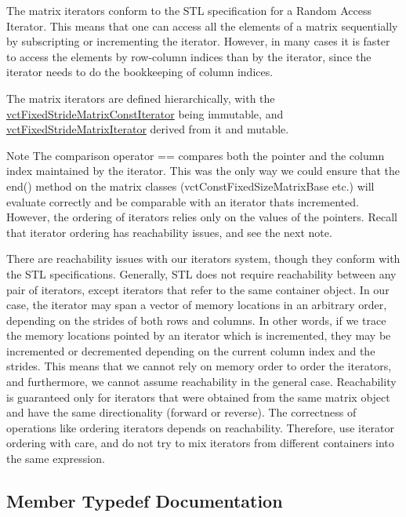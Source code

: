 The matrix iterators conform to the S\+T\+L specification for a Random Access Iterator. This means that one can access all the elements of a matrix sequentially by subscripting or incrementing the iterator. However, in many cases it is faster to access the elements by row-\/column indices than by the iterator, since the iterator needs to do the bookkeeping of column indices.

The matrix iterators are defined hierarchically, with the \hyperlink{classvct_fixed_stride_matrix_const_iterator}{vct\+Fixed\+Stride\+Matrix\+Const\+Iterator} being immutable, and \hyperlink{classvct_fixed_stride_matrix_iterator}{vct\+Fixed\+Stride\+Matrix\+Iterator} derived from it and mutable.

\begin{DoxyNote}{Note}
The comparison operator == compares both the pointer and the column index maintained by the iterator. This was the only way we could ensure that the end() method on the matrix classes (vct\+Const\+Fixed\+Size\+Matrix\+Base etc.) will evaluate correctly and be comparable with an iterator that\textquotesingle{}s incremented. However, the ordering of iterators relies only on the values of the pointers. Recall that iterator ordering has reachability issues, and see the next note.

There are reachability issues with our iterators system, though they conform with the S\+T\+L specifications. Generally, S\+T\+L does not require reachability between any pair of iterators, except iterators that refer to the same container object. In our case, the iterator may span a vector of memory locations in an arbitrary order, depending on the strides of both rows and columns. In other words, if we trace the memory locations pointed by an iterator which is incremented, they may be incremented or decremented depending on the current column index and the strides. This means that we cannot rely on memory order to order the iterators, and furthermore, we cannot assume reachability in the general case. Reachability is guaranteed only for iterators that were obtained from the same matrix object and have the same directionality (forward or reverse). The correctness of operations like ordering iterators depends on reachability. Therefore, use iterator ordering with care, and do not try to mix iterators from different containers into the same expression. 
\end{DoxyNote}


\subsection{Member Typedef Documentation}
\hypertarget{classvct_fixed_stride_matrix_const_iterator_a305e6edbe5e4e2560f9bf01d3079a118}{}
